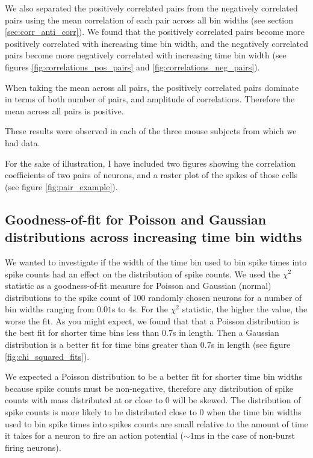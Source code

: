    We also separated the positively correlated pairs from the negatively correlated pairs using the mean correlation of each pair across all bin widths (see section \ref{sec:corr_anti_corr}). We found that the positively correlated pairs become more positively correlated with increasing time bin width, and the negatively correlated pairs become more negatively correlated with increasing time bin width (see figures \ref{fig:correlations_pos_pairs} and \ref{fig:correlations_neg_pairs}).

    When taking the mean across all pairs, the positively correlated pairs dominate in terms of both number of pairs, and amplitude of correlations. Therefore the mean across all pairs is positive.

    These results were observed in each of the three mouse subjects from which we had data.

    For the sake of illustration, I have included two figures showing the correlation coefficients of two pairs of neurons, and a raster plot of the spikes of those cells (see figure \ref{fig:pair_example}).

    \subsection{Goodness-of-fit for Poisson and Gaussian distributions across increasing time bin widths}
    We wanted to investigate if the width of the time bin used to bin spike times into spike counts had an effect on the distribution of spike counts.  We used the $\chi^2$ statistic as a goodness-of-fit measure for Poisson and Gaussian (normal) distributions to the spike count of $100$ randomly chosen neurons for a number of bin widths ranging from $0.01$s to $4$s. For the $\chi^2$ statistic, the higher the value, the worse the fit. As you might expect, we found that that a Poisson distribution is the best fit for shorter time bins less than $0.7$s in length. Then a Gaussian distribution is a better fit for time bins greater than $0.7$s in length (see figure \ref{fig:chi_squared_fits}).

    We expected a Poisson distribution to be a better fit for shorter time bin widths because spike counts must be non-negative, therefore any distribution of spike counts with mass distributed at or close to $0$ will be skewed. The distribution of spike counts is more likely to be distributed close to $0$ when the time bin widths used to bin spike times into spikes counts are small relative to the amount of time it takes for a neuron to fire an action potential ($\sim 1$ms in the case of non-burst firing neurons).

